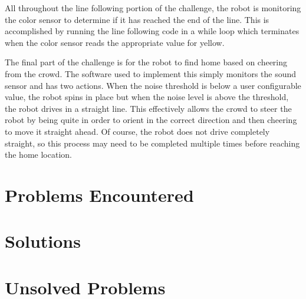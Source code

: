 \documentclass[journal]{IEEEtran}
\begin{document}
All throughout the line following portion of the challenge, the robot is monitoring the color sensor to determine if it has reached the end of the line. This is accomplished by running the line following code in a while loop which terminates when the color sensor reads the appropriate value for yellow.

The final part of the challenge is for the robot to find home based on cheering from the crowd. The software used to implement this simply monitors the sound sensor and has two actions. When the noise threshold is below a user configurable value, the robot spins in place but when the noise level is above the threshold, the robot drives in a straight line. This effectively allows the crowd to steer the robot by being quite in order to orient in the correct direction and then cheering to move it straight ahead. Of course, the robot does not drive completely straight, so this process may need to be completed multiple times before reaching the home location.

\section{Problems Encountered}\label{S.problems}


\section{Solutions}\label{S.solutions}


\section{Unsolved Problems}\label{S.unsolved}
\end{document}
